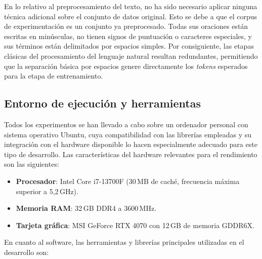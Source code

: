 En lo relativo al preprocesamiento del texto, no ha sido necesario aplicar ninguna técnica adicional sobre el conjunto de datos original. Esto se debe a que el corpus de experimentación es un conjunto ya preprocesado. Todas sus oraciones están escritas en minúsculas, no tienen signos de puntuación o caracteres especiales, y sus términos están delimitados por espacios simples. Por consiguiente, las etapas clásicas del procesamiento del lenguaje natural resultan redundantes, permitiendo que la separación básica por espacios genere directamente los \textit{tokens} esperados para la etapa de entrenamiento.

\subsection{Entorno de ejecución y herramientas}

Todos los experimentos se han llevado a cabo sobre un ordenador personal con sistema operativo Ubuntu, cuya compatibilidad con las librerías empleadas y su integración con el hardware disponible lo hacen especialmente adecuado para este tipo de desarrollo. Las características del hardware relevantes para el rendimiento son las siguientes:

\begin{itemize}
  \item \textbf{Procesador}: Intel Core i7-13700F (30\,MB de caché, frecuencia máxima superior a 5,2\,GHz).
  \item \textbf{Memoria RAM}: 32\,GB DDR4 a 3600\,MHz.
  \item \textbf{Tarjeta gráfica}: MSI GeForce RTX 4070 con 12\,GB de memoria GDDR6X.
\end{itemize}

En cuanto al software, las herramientas y librerías principales utilizadas en el desarrollo son:

